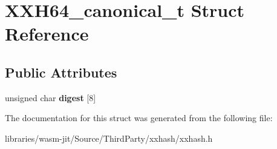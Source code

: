 \hypertarget{struct_x_x_h64__canonical__t}{}\section{X\+X\+H64\+\_\+canonical\+\_\+t Struct Reference}
\label{struct_x_x_h64__canonical__t}
\subsection*{Public Attributes}
\begin{DoxyCompactItemize}
\item 
\mbox{\label{struct_x_x_h64__canonical__t_ad62f1c1b20213c45a6686e1e3446c703}} 
unsigned char {\bfseries digest} \mbox{[}8\mbox{]}
\end{DoxyCompactItemize}


The documentation for this struct was generated from the following file\+:\begin{DoxyCompactItemize}
\item 
libraries/wasm-\/jit/\+Source/\+Third\+Party/xxhash/xxhash.\+h\end{DoxyCompactItemize}

